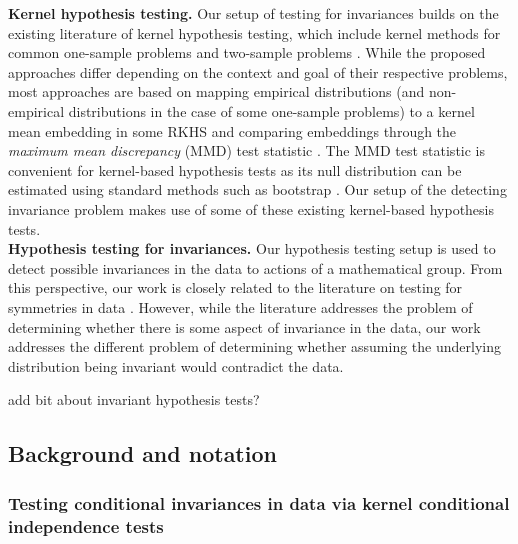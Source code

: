 \textbf{Kernel hypothesis testing.} Our setup of testing for invariances builds on the existing literature of kernel hypothesis testing, which include kernel methods for common one-sample problems \parencite{Zhang:2011,Doran:2014,Kellner:2015,Chwialkowski:2016,Jitkrittum:2020} and two-sample problems \parencite{Gretton:2007,Gretton:2012}. While the proposed approaches differ depending on the context and goal of their respective problems, most approaches are based on mapping empirical  distributions (and non-empirical distributions in the case of some one-sample problems) to a kernel mean embedding in some RKHS and comparing embeddings through the \textit{maximum mean discrepancy} (MMD) test statistic \parencite{Harchaoui:2013}. The MMD test statistic is convenient for kernel-based hypothesis tests as its null distribution can be estimated using standard methods such as bootstrap \parencite{Gretton:2012}. Our setup of the detecting invariance problem makes use of some of these existing kernel-based hypothesis tests.
\\

\textbf{Hypothesis testing for invariances.}
Our hypothesis testing setup is used to detect possible invariances in the data to actions of a mathematical group. From this perspective, our work is closely related to the literature on testing for symmetries in data \parencite{Henze:2003,NgatchouWandji:2009,Partlett:2015}. However, while the literature addresses the problem of determining whether there is some aspect of invariance in the data, our work addresses the different problem of determining whether assuming the underlying distribution being invariant would contradict the data.

\todo add bit about invariant hypothesis tests?

\subsection{Background and notation}

\subsubsection{Testing conditional invariances in data via kernel conditional independence tests}

